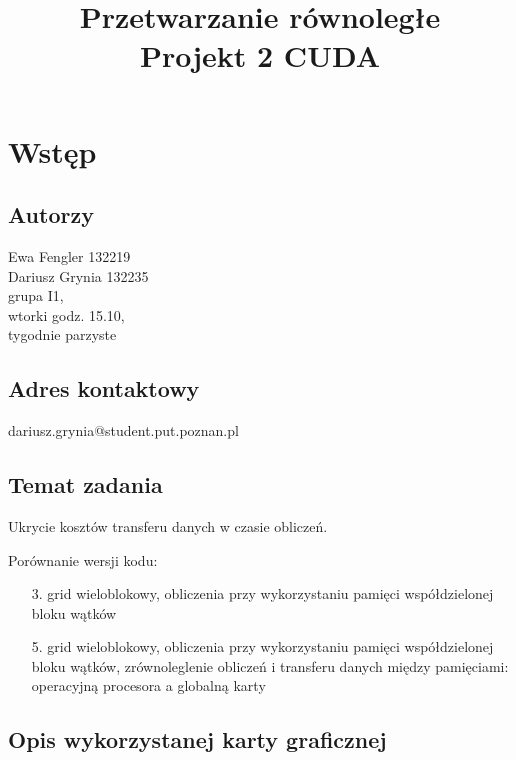 \documentclass[12pt,a4paper]{article}
\date{}
\title{Przetwarzanie równoległe \\ \Large Projekt 2 CUDA}
\begin{document}
\maketitle
\thispagestyle{empty}


\section{Wstęp}

\subsection{Autorzy}
Ewa Fengler 132219\\
Dariusz Grynia 132235\\
grupa I1,\\
wtorki godz. 15.10,\\
tygodnie parzyste\\

\subsection{Adres kontaktowy}
dariusz.grynia@student.put.poznan.pl

\subsection{Temat zadania}
Ukrycie kosztów transferu danych w czasie obliczeń.

Porównanie wersji kodu:
\begin{itemize}
\item [3.] grid wieloblokowy, obliczenia przy wykorzystaniu pamięci współdzielonej bloku wątków
\item [5.] grid wieloblokowy, obliczenia przy wykorzystaniu pamięci współdzielonej bloku wątków, zrównoleglenie obliczeń i transferu danych między pamięciami: operacyjną procesora a globalną karty
\end{itemize}

\subsection{Opis wykorzystanej karty graficznej}
\end{document}
